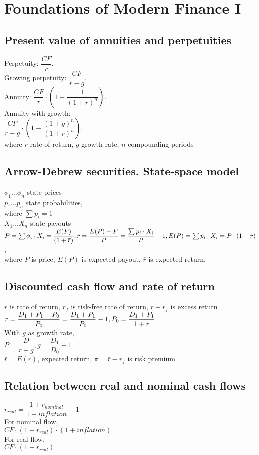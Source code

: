 \section{Foundations of Modern Finance I}
\subsection*{Present value of annuities and perpetuities}
Perpetuity: $\dfrac{CF}{r}$. \\ Growing perpetuity: $\dfrac{CF}{r -g}$. \\ Annuity: $\dfrac{CF}{r}\cdot\left(1-\dfrac{1}{(1+r)^n}\right)$. \\ Annuity with growth: \\ $\dfrac{CF}{r-g}\cdot\left(1 - \dfrac{(1+g)^n}{(1+r)^n}\right)$, \\where $r$ rate of return, $g$ growth rate, $n$ compounding periods
\subsection*{Arrow-Debrew securities. State-space model}
$\phi_1\dots\phi_n$ state prices \\
$p_1\dots p_n$ state probabilities, \\ where $\sum p_i = 1$ \\
$X_1\dots X_n$ state payouts \\
$P = \sum\phi_i\cdot X_i  = \dfrac{E(P)}{(1+\bar{r})}, \\ \bar{r} = \dfrac{E(P) - P}{P} = \dfrac{\sum p_i \cdot X_i}{P} - 1, \\ E(P) = \sum p_i \cdot X_i = P\cdot(1+\bar{r})$, \\ where $P$ is price, $E(P)$ is expected payout, $\bar{r}$ is expected return.
\subsection*{Discounted cash flow and rate of return}
$r$ is rate of return, $r_f$ is risk-free rate of return, $r - r_f$ is excess return \\
$ r = \dfrac{D_1 + P_1 - P_0}{P_0} = \dfrac{D_1 + P_1}{P_0} - 1, \\ P_0 = \dfrac{D_1+P_1}{1+r}$ \\
With $g$ as growth rate, \\ $P=\dfrac{D}{r-g}, g=\dfrac{D_1}{D_0} - 1$ \\
$\bar{r}=E(r)$, expected return, $\pi = \bar{r} - r_f$ is risk premium
\subsection*{Relation between real and nominal cash flows}
$r_{real}=\dfrac{1+r_{nominal}}{1+inflation} - 1$ \\
For nominal flow,\\ $CF\cdot(1+r_{real})\cdot(1+inflation)$ \\
For real flow, \\ $CF\cdot(1+r_{real})$
